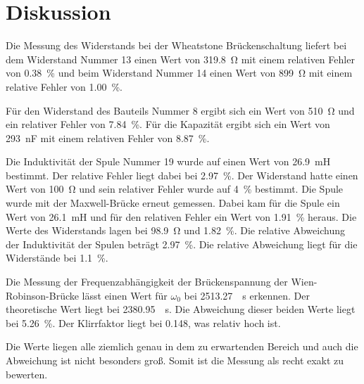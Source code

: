\section{Diskussion}
\label{sec:Diskussion}

Die Messung des Widerstands bei der Wheatstone Brückenschaltung liefert bei dem Widerstand Nummer \num{13} 
einen Wert von \SI{319.8}{\ohm} mit einem relativen Fehler von \SI{0.38}{\percent} und beim Widerstand Nummer 
\num{14} einen Wert von \SI{899}{\ohm} mit einem relative Fehler von \SI{1.00}{\percent}. 

\noindent Für den Widerstand des Bauteils Nummer \num{8} ergibt sich ein Wert von 
\SI{510}{\ohm} und ein relativer Fehler von \SI{7.84}{\percent}. Für die Kapazität ergibt sich ein Wert von \SI{293}{\nano\farad} mit einem relativen Fehler von \SI{8.87}{\percent}.

\noindent Die Induktivität der Spule Nummer \num{19} wurde auf einen Wert von \SI{26.9}{\milli\henry} bestimmt. 
Der relative Fehler liegt dabei bei \SI{2.97}{\percent}. Der Widerstand hatte einen Wert von \SI{100}{\ohm} 
und sein relativer Fehler wurde auf \SI{4}{\percent} bestimmt. 
Die Spule wurde mit der Maxwell-Brücke erneut gemessen. Dabei kam für die Spule ein Wert von \SI{26.1}{\milli\henry} 
und für den relativen Fehler ein Wert von \SI{1.91}{\percent} heraus. Die Werte des Widerstands lagen bei 
\SI{98.9}{\ohm} und \SI{1.82}{\percent}. Die relative Abweichung der Induktivität der Spulen beträgt \SI{2.97}{\percent}. Die relative Abweichung liegt für die Widerstände bei \SI{1.1}{\percent}.

\noindent Die Messung der Frequenzabhängigkeit der Brückenspannung der Wien-Robinson-Brücke lässt einen Wert für 
$\omega_0$ bei \SI[per-mode=fraction]{2513.27}{\per\second} erkennen. Der theoretische Wert liegt bei \SI[per-mode=fraction]{2380.95}{\per\second}. Die Abweichung dieser 
beiden Werte liegt bei \SI{5.26}{\percent}. Der Klirrfaktor liegt bei \num{0.148}, was relativ hoch ist.

\noindent Die Werte liegen alle ziemlich genau in dem zu erwartenden Bereich und auch die Abweichung ist nicht besonders groß. Somit ist die Messung als recht exakt zu bewerten. 

